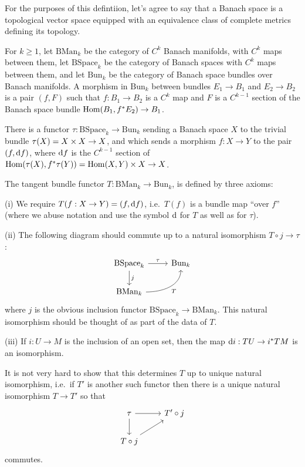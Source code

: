 \documentclass{amsart}
\begin{document}
\begin{defn}
  For the purposes of this defintiion, let's agree to say that a Banach space is a topological vector space equipped with an equivalence class of complete metrics defining its topology.
  
  For $k\ge 1$, let $\text{BMan}_{k}$ be the category of $C^{k}$ Banach manifolds, with $C^{k}$ maps between them, let $\text{BSpace}_{k}$ be the category of Banach spaces with $C^{k}$ maps between them, and let $\text{Bun}_{k}$ be the category of Banach space bundles over Banach manifolds. A morphism in $\text{Bun}_{k}$ between bundles $E_{1}\to B_{1}$ and $E_{2}\to B_{2}$ is a pair $(f,F)$ such that $f:B_{1}\to B_{2}$ is a $C^{k}$ map and $F$ is a $C^{k-1}$ section of the Banach space bundle $\operatorname{\mathrm{Hom}}(B_{1},f^{*}E_{2})\to B_{1}$.

  There is a functor $\tau:\text{BSpace}_{k}\to \text{Bun}_{k}$ sending a Banach space $X$ to the trivial bundle $\tau(X)=X\times X\to X$, and which sends a morphism $f:X\to Y$ to the pair $(f,\mathrm{d} f)$, where $\mathrm{d} f$ is the $C^{k-1}$ section of $\operatorname{\mathrm{Hom}}(\tau(X),f^{*}\tau(Y))=\operatorname{\mathrm{Hom}}(X,Y)\times X\to X$.

  The tangent bundle functor $T:\text{BMan}_{k}\to \text{Bun}_{k}$, is defined by three axioms:

  (i) We require $T(f:X\to Y)=(f,\mathrm{d} f)$, i.e.\ $T(f)$ is a bundle map ``over $f$'' (where we abuse notation and use the symbol $\mathrm{d}$ for $T$ as well as for $\tau$). 

  (ii) The following diagram should commute up to a natural isomorphism $T\circ j\to \tau$:
  \begin{equation*}
    \begin{tikzcd}
      \text{BSpace}_{k}\arrow[r,"\tau"]\arrow[d,"j"]&\text{Bun}_{k}\\
      \text{BMan}_{k}\arrow[ru,"T",swap,out=0,in=-90]&
    \end{tikzcd}
  \end{equation*}
  where $j$ is the obvious inclusion functor $\text{BSpace}_{k}\to \text{BMan}_{k}$. This natural isomorphism should be thought of as part of the data of $T$.

  (iii) If $i:U\to M$ is the inclusion of an open set, then the map $\mathrm{d} i:TU\to i^{*}TM$ is an isomorphism.

  It is not very hard to show that this determines $T$ up to unique natural isomorphism, i.e.\ if $T'$ is another such functor then there is a unique natural isomorphism $T\to T'$ so that
  \begin{equation*}
    \begin{tikzcd}
      \tau\arrow[r]\arrow[d]&T'\circ j\\
      T\circ j\arrow[ru]
    \end{tikzcd}
  \end{equation*}
  commutes.
\end{defn}
\end{document}
